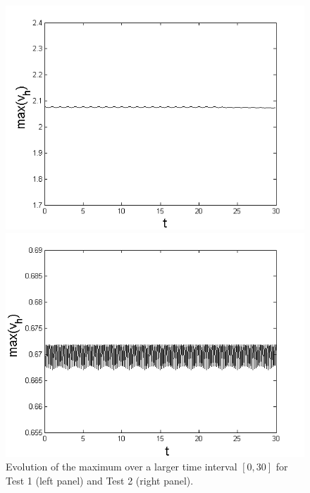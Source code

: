 \documentclass[%
 aip,
cp,  
 amsmath,amssymb,
 reprint,
]{iopconfser}
\begin{document}
\begin{figure}[H]\vspace{0.2cm}
	\centering
	\begin{minipage}[b]{0.40\linewidth}
		\includegraphics[width=\linewidth]{maximum_30_T30_bt3_c045_h005.png}
	\end{minipage}	
	\begin{minipage}[b]{0.40\linewidth}
		 \includegraphics[width=\linewidth]{maximum_30_T30_bt1_c090_h020.png}
	\end{minipage}
\caption{Evolution of the maximum over a larger time interval $[0, 30]$ for Test 1 (left panel) and Test 2 (right panel).}
\label{Maximum}
\end{figure}
\end{document}
